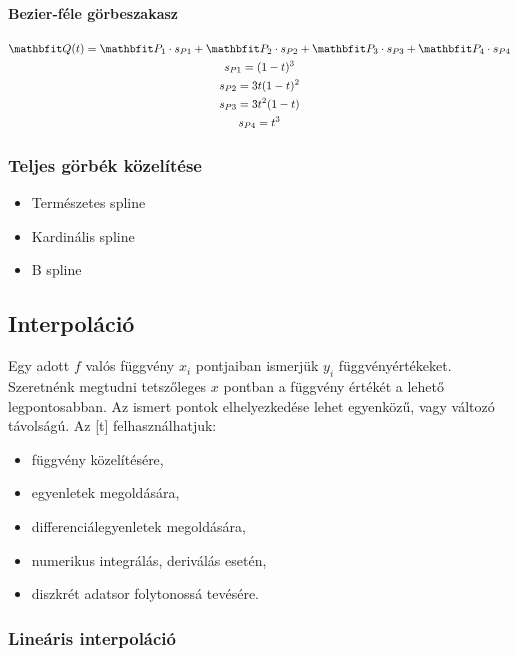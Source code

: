 \documentclass[../../main.tex]{subfiles}
\begin{document}
\paragraph{Bezier-féle görbeszakasz}
\begin{gather*}
  \rvec Q(t)
  = \rvec P_1 \cdot s_{P1}
  + \rvec P_2 \cdot s_{P2}
  + \rvec P_3 \cdot s_{P3}
  + \rvec P_4 \cdot s_{P4}
  \\
  s_{P1} = (1-t)^3
  \\
  s_{P2} = 3t(1-t)^2
  \\
  s_{P3} = 3t^2(1-t)
  \\
  s_{P4} = t^3
\end{gather*}

\subsubsection{Teljes görbék közelítése}

\begin{itemize}
  \item Természetes spline
  \item Kardinális spline
  \item B spline
\end{itemize}

\subsection{Interpoláció}

Egy adott $f$ valós függvény $x_i$ pontjaiban ismerjük $y_i$ függvényértékeket.
Szeretnénk megtudni tetszőleges $x$ pontban a függvény értékét a lehető
legpontosabban. Az ismert pontok elhelyezkedése lehet egyenközű, vagy változó
távolságú. Az [t] felhasználhatjuk:
\begin{itemize}
  \item függvény közelítésére,
  \item egyenletek megoldására,
  \item differenciálegyenletek megoldására,
  \item numerikus integrálás, deriválás esetén,
  \item diszkrét adatsor folytonossá tevésére.
\end{itemize}

\subsubsection{Lineáris interpoláció}
\end{document}
